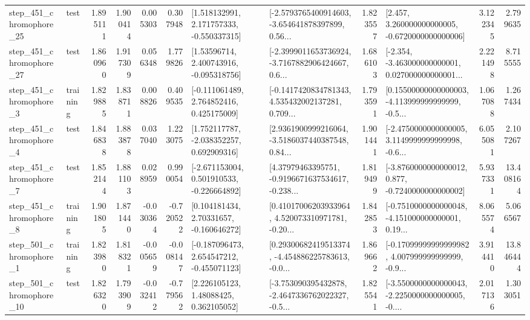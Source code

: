 \begin{tabular}{llrrrrllrlrr}
  step\_451\_chromophore\_25 &      test &      1.895111 &    1.900414 &      0.005303 &  0.307948 &    [1.518132991, 2.171757333, -0.550337315] &  [-2.5793765400914603, -3.654641878397899, 0.56... &       1.823557 &    [2.457, 3.260000000000005, -0.6720000000000006] &            3.122345 &          2.799635 \\
  step\_451\_chromophore\_27 &      test &      1.860960 &    1.917309 &      0.056348 &  1.779826 &     [1.53596714, 2.400743916, -0.095318756] &  [-2.3999011653736924, -3.7167882906424667, 0.6... &       1.686103 &  [-2.354, -3.463000000000001, 0.027000000000001... &            2.221498 &          8.715555 \\
   step\_451\_chromophore\_3 &  training &      1.829885 &    1.838711 &      0.008826 &  0.409535 &    [-0.111061489, 2.764852416, 0.425175009] &  [-0.1417420834781343, 4.535432002137281, 0.709... &       1.793591 &  [0.15500000000000003, -4.113999999999999, -0.5... &            1.067088 &          1.267434 \\
   step\_451\_chromophore\_4 &      test &      1.846838 &    1.883878 &      0.037040 &  1.223075 &    [1.752117787, -2.038352257, 0.692909316] &  [2.9361900999216064, -3.5186037440387548, 0.84... &       1.901441 &  [-2.4750000000000005, 3.1149999999999998, -0.6... &            6.055081 &          2.107267 \\
   step\_451\_chromophore\_7 &      test &      1.852144 &    1.881103 &      0.028959 &  0.990054 &   [-2.671153004, 0.501910533, -0.226664892] &  [4.37979463395751, -0.9196671637534617, -0.238... &       1.819499 &  [-3.8760000000000012, 0.877, -0.7240000000000002] &            5.937331 &         13.408164 \\
   step\_451\_chromophore\_8 &  training &      1.901805 &    1.871440 &     -0.030364 & -0.720522 &     [0.104181434, 2.70331657, -0.160646272] &  [0.41017006203933964, 4.520073310971781, -0.20... &       1.842853 &  [-0.7510000000000048, -4.151000000000001, 0.19... &            8.065574 &          5.066567 \\
   step\_501\_chromophore\_1 &  training &      1.823980 &    1.818321 &     -0.005659 & -0.008147 &   [-0.187096473, 2.654547212, -0.455071123] &  [0.29300682419513374, -4.454886225783613, -0.0... &       1.869662 &  [-0.17099999999999982, 4.007999999999999, -0.9... &            3.914410 &         13.846444 \\
  step\_501\_chromophore\_10 &      test &      1.826320 &    1.793909 &     -0.032412 & -0.779562 &      [2.226105123, 1.48088425, 0.362105052] &  [-3.753090395432878, -2.4647336762022327, -0.5... &       1.825541 &  [-3.5500000000000043, -2.2250000000000005, -0.... &            2.017136 &          1.303051 \\

\end{tabular}
